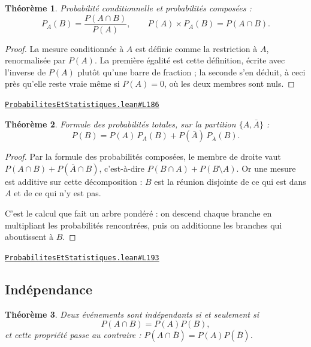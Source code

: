 \documentclass[11pt,a4paper]{article}
\theoremstyle{definition}
\theoremstyle{plain}
\newtheorem{theoreme}{Théorème}
\newcommand{\source}[2]{\par\smallskip\noindent\hfill{\footnotesize\href{#1}{\texttt{#2}}}\par\smallskip}
\begin{document}
\begin{theoreme}
Probabilité conditionnelle et probabilités composées :
\[ P_A(B) = \frac{P(A \cap B)}{P(A)} , \qquad P(A) \times P_A(B) = P(A \cap B) . \]
\end{theoreme}

\begin{proof}
La mesure conditionnée à $A$ est définie comme la restriction à $A$, renormalisée par
$P(A)$. La première égalité est cette définition, écrite avec l'inverse
de $P(A)$ plutôt qu'une barre de fraction ; la seconde s'en déduit, à ceci près qu'elle
reste vraie même si $P(A) = 0$, où les deux membres sont nuls.
\end{proof}
\source{https://github.com/Commutator-IO/learn-lean/blob/main/courses/02-lycee/09-probabilites-et-statistiques/ProbabilitesEtStatistiques.lean\#L186}{ProbabilitesEtStatistiques.lean\#L186}

\begin{theoreme}
Formule des probabilités totales, sur la partition $\{A, \bar A\}$ :
\[ P(B) = P(A)\,P_A(B) + P(\bar A)\,P_{\bar A}(B) . \]
\end{theoreme}

\begin{proof}
Par la formule des probabilités composées, le membre de droite vaut
$P(A \cap B) + P(\bar A \cap B)$, c'est-à-dire $P(B \cap A) + P(B \setminus A)$. Or une
mesure est additive sur cette décomposition : $B$ est la réunion disjointe de ce qui est
dans $A$ et de ce qui n'y est pas.

\medskip\noindent
C'est le calcul que fait un arbre pondéré : on descend chaque branche en multipliant les
probabilités rencontrées, puis on additionne les branches qui aboutissent à $B$.
\end{proof}
\source{https://github.com/Commutator-IO/learn-lean/blob/main/courses/02-lycee/09-probabilites-et-statistiques/ProbabilitesEtStatistiques.lean\#L193}{ProbabilitesEtStatistiques.lean\#L193}

\subsection{Indépendance}

\begin{theoreme}
Deux événements sont indépendants si et seulement si
\[ P(A \cap B) = P(A)P(B) , \]
et cette propriété passe au contraire : $P(A \cap \bar B) = P(A)P(\bar B)$.
\end{theoreme}
\end{document}
